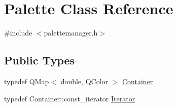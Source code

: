 \hypertarget{class_palette}{}\section{Palette Class Reference}
\label{class_palette}


{\ttfamily \#include $<$palettemanager.\+h$>$}

\subsection*{Public Types}
\begin{DoxyCompactItemize}
\item 
typedef Q\+Map$<$ double, Q\+Color $>$ \mbox{\hyperlink{class_palette_a5215559c77b17d9ff9eaec3c0910f759}{Container}}
\item 
typedef Container\+::const\+\_\+iterator \mbox{\hyperlink{class_palette_adbfe061d30e0b5f90145bd302003fab0}{Iterator}}
\end{DoxyCompactItemize}
